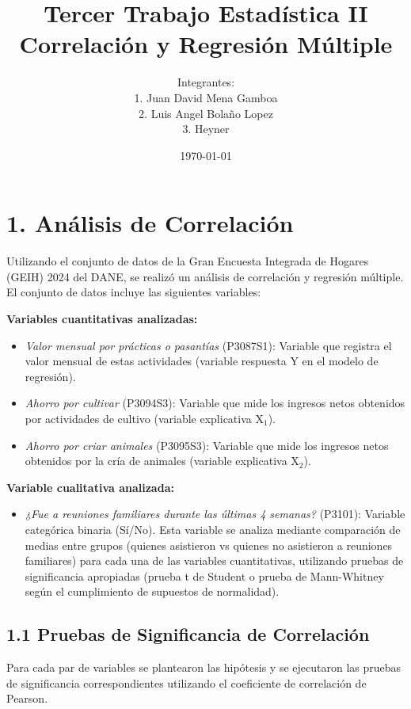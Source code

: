 \documentclass[12pt,a4paper]{article}
\title{\textbf{Tercer Trabajo Estadística II} \\[0.5cm]
Correlación y Regresión Múltiple}
\author{
Integrantes: \\ 
1. Juan David Mena Gamboa \\ 
2. Luis Angel Bolaño Lopez \\ 
3. Heyner}
\date{\today}
\begin{document}
\maketitle

\section*{1. Análisis de Correlación}

Utilizando el conjunto de datos de la Gran Encuesta Integrada de Hogares (GEIH) 2024 del DANE, se realizó un análisis de correlación y regresión múltiple. El conjunto de datos incluye las siguientes variables:

\textbf{Variables cuantitativas analizadas:}
\begin{itemize}
    \item \textit{Valor mensual por prácticas o pasantías} (P3087S1): Variable que registra el valor mensual de estas actividades (variable respuesta Y en el modelo de regresión).
    \item \textit{Ahorro por cultivar} (P3094S3): Variable que mide los ingresos netos obtenidos por actividades de cultivo (variable explicativa X$_1$).
    \item \textit{Ahorro por criar animales} (P3095S3): Variable que mide los ingresos netos obtenidos por la cría de animales (variable explicativa X$_2$).
\end{itemize}

\textbf{Variable cualitativa analizada:}
\begin{itemize}
    \item \textit{¿Fue a reuniones familiares durante las últimas 4 semanas?} (P3101): Variable categórica binaria (Sí/No). Esta variable se analiza mediante comparación de medias entre grupos (quienes asistieron vs quienes no asistieron a reuniones familiares) para cada una de las variables cuantitativas, utilizando pruebas de significancia apropiadas (prueba t de Student o prueba de Mann-Whitney según el cumplimiento de supuestos de normalidad).
\end{itemize}

\subsection*{1.1 Pruebas de Significancia de Correlación}

Para cada par de variables se plantearon las hipótesis y se ejecutaron las pruebas de significancia correspondientes utilizando el coeficiente de correlación de Pearson.
\end{document}
